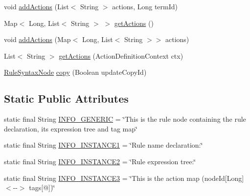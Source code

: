 \begin{DoxyCompactItemize}
\item 
void \hyperlink{classit_1_1emarolab_1_1cagg_1_1core_1_1language_1_1syntax_1_1abstractTree_1_1syntaxNodeType_1_1RuleSyntaxNode_aca46c9a9c150fe7fc414cd7b78c10ed6}{add\-Actions} (List$<$ String $>$ actions, Long term\-Id)
\item 
Map$<$ Long, List$<$ String $>$ $>$ \hyperlink{classit_1_1emarolab_1_1cagg_1_1core_1_1language_1_1syntax_1_1abstractTree_1_1syntaxNodeType_1_1RuleSyntaxNode_a76da7cae187a08b2bb2fa980a1d3575f}{get\-Actions} ()
\item 
void \hyperlink{classit_1_1emarolab_1_1cagg_1_1core_1_1language_1_1syntax_1_1abstractTree_1_1syntaxNodeType_1_1RuleSyntaxNode_a1e4ff3b5c80168f160de169a457432bf}{add\-Actions} (Map$<$ Long, List$<$ String $>$$>$ actions)
\item 
List$<$ String $>$ \hyperlink{classit_1_1emarolab_1_1cagg_1_1core_1_1language_1_1syntax_1_1abstractTree_1_1syntaxNodeType_1_1RuleSyntaxNode_a055661aef0aeedda73bd36929c140132}{get\-Actions} (Action\-Definition\-Context ctx)
\item 
\hyperlink{classit_1_1emarolab_1_1cagg_1_1core_1_1language_1_1syntax_1_1abstractTree_1_1syntaxNodeType_1_1RuleSyntaxNode}{Rule\-Syntax\-Node} \hyperlink{classit_1_1emarolab_1_1cagg_1_1core_1_1language_1_1syntax_1_1abstractTree_1_1syntaxNodeType_1_1RuleSyntaxNode_ad1fc77cd00f9c095def3ef7a034208a7}{copy} (Boolean update\-Copy\-Id)
\end{DoxyCompactItemize}
\subsection*{Static Public Attributes}
\begin{DoxyCompactItemize}
\item 
static final String \hyperlink{classit_1_1emarolab_1_1cagg_1_1core_1_1language_1_1syntax_1_1abstractTree_1_1syntaxNodeType_1_1RuleSyntaxNode_a0fc88ce6cb739c64638fd94fcfe77044}{I\-N\-F\-O\-\_\-\-G\-E\-N\-E\-R\-I\-C} = \char`\"{}This is the rule node containing the rule declaration, its expression tree and tag map\char`\"{}
\item 
static final String \hyperlink{classit_1_1emarolab_1_1cagg_1_1core_1_1language_1_1syntax_1_1abstractTree_1_1syntaxNodeType_1_1RuleSyntaxNode_a2b3d3c7c384a636aca14bb7fd8c27f51}{I\-N\-F\-O\-\_\-\-I\-N\-S\-T\-A\-N\-C\-E1} = \char`\"{}Rule name declaration\-:\char`\"{}
\item 
static final String \hyperlink{classit_1_1emarolab_1_1cagg_1_1core_1_1language_1_1syntax_1_1abstractTree_1_1syntaxNodeType_1_1RuleSyntaxNode_a5255d8d602fed6c6f55dec8c73b21095}{I\-N\-F\-O\-\_\-\-I\-N\-S\-T\-A\-N\-C\-E2} = \char`\"{}Rule expression tree\-:\char`\"{}
\item 
static final String \hyperlink{classit_1_1emarolab_1_1cagg_1_1core_1_1language_1_1syntax_1_1abstractTree_1_1syntaxNodeType_1_1RuleSyntaxNode_aea4983c9ca522dd17e1525ce217128f0}{I\-N\-F\-O\-\_\-\-I\-N\-S\-T\-A\-N\-C\-E3} = \char`\"{}This is the action map (node\-Id\mbox{[}Long\mbox{]} $<$-\/-\/$>$ tags\mbox{[}@\mbox{]})\char`\"{}
\end{DoxyCompactItemize}
